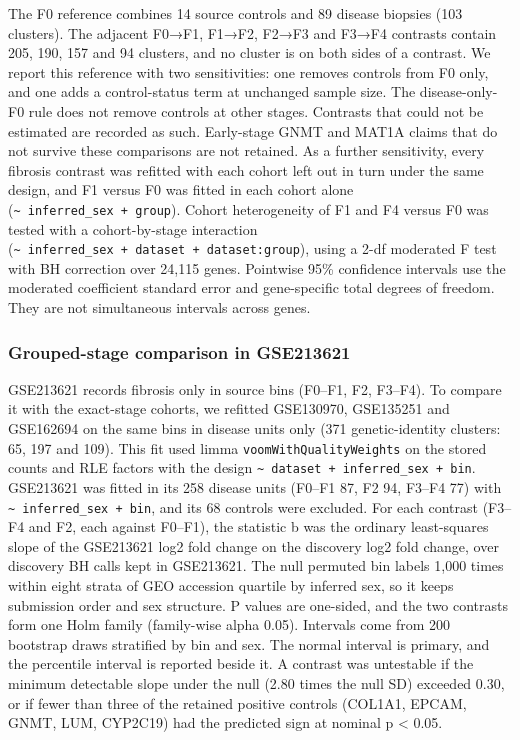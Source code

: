 The F0 reference combines 14 source controls and 89 disease biopsies (103 clusters). The adjacent F0→F1, F1→F2, F2→F3 and F3→F4 contrasts contain 205, 190, 157 and 94 clusters, and no cluster is on both sides of a contrast. We report this reference with two sensitivities: one removes controls from F0 only, and one adds a control-status term at unchanged sample size. The disease-only-F0 rule does not remove controls at other stages. Contrasts that could not be estimated are recorded as such. Early-stage GNMT and MAT1A claims that do not survive these comparisons are not retained. As a further sensitivity, every fibrosis contrast was refitted with each cohort left out in turn under the same design, and F1 versus F0 was fitted in each cohort alone (\texttt{\textasciitilde{}\ inferred\_\allowbreak{}sex\ +\ group}). Cohort heterogeneity of F1 and F4 versus F0 was tested with a cohort-by-stage interaction (\texttt{\textasciitilde{}\ inferred\_\allowbreak{}sex\ +\ dataset\ +\ dataset:group}), using a 2-df moderated F test with BH correction over 24,115 genes. Pointwise 95\% confidence intervals use the moderated coefficient standard error and gene-specific total degrees of freedom. They are not simultaneous intervals across genes.

\subsubsection{Grouped-stage comparison in GSE213621}\label{grouped-stage-comparison-in-gse213621}

GSE213621 records fibrosis only in source bins (F0--F1, F2, F3--F4). To compare it with the exact-stage cohorts, we refitted GSE130970, GSE135251 and GSE162694 on the same bins in disease units only (371 genetic-identity clusters: 65, 197 and 109). This fit used limma \texttt{voomWithQualityWeights} on the stored counts and RLE factors with the design \texttt{\textasciitilde{}\ dataset\ +\ inferred\_\allowbreak{}sex\ +\ bin}. GSE213621 was fitted in its 258 disease units (F0--F1 87, F2 94, F3--F4 77) with \texttt{\textasciitilde{}\ inferred\_\allowbreak{}sex\ +\ bin}, and its 68 controls were excluded. For each contrast (F3--F4 and F2, each against F0--F1), the statistic b was the ordinary least-squares slope of the GSE213621 log2 fold change on the discovery log2 fold change, over discovery BH calls kept in GSE213621. The null permuted bin labels 1,000 times within eight strata of GEO accession quartile by inferred sex, so it keeps submission order and sex structure. P values are one-sided, and the two contrasts form one Holm family (family-wise alpha 0.05). Intervals come from 200 bootstrap draws stratified by bin and sex. The normal interval is primary, and the percentile interval is reported beside it. A contrast was untestable if the minimum detectable slope under the null (2.80 times the null SD) exceeded 0.30, or if fewer than three of the retained positive controls (COL1A1, EPCAM, GNMT, LUM, CYP2C19) had the predicted sign at nominal p \textless{} 0.05.

